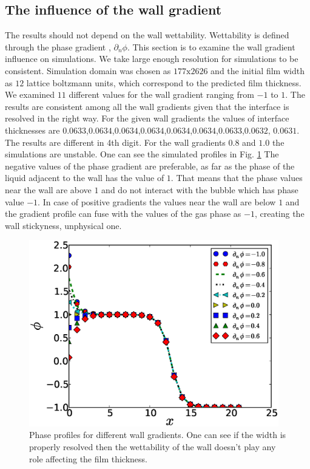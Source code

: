 \documentclass{article}
\begin{document}
\subsection{The influence of the wall gradient}
The results should not depend on the wall wettability. Wettability is defined
through the phase gradient \cite{pooley-contact}, $\partial_n \phi$. This
section is to examine the wall gradient influence on simulations. We take large
enough resolution for simulations to be consistent. Simulation domain was
chosen as $177\mathrm{x}2626$ and the initial film width as
$12$ lattice boltzmann units, which correspond to the predicted film thickness.
We examined $11$ different values for the wall
gradient ranging from $-1$ to $1$. The results are consistent among all the
wall gradients given that the interface is resolved in the right way. For the
given wall gradients the values of interface thicknesses are
$0.0633$,$0.0634$,$0.0634$,$0.0634$,$0.0634$,$0.0634$,$0.0633$,$0.0632$,
$0.0631$. The results are different in 4th digit. For the wall gradients $0.8$
and $1.0$ the
simulations are unstable. One can see the simulated profiles in Fig.
\ref{fig:gradients:profiles} The negative values of the phase gradient are
preferable, as
far as the phase of the liquid adjacent to the wall has the value of $1$. That
means that the phase values near the wall are above $1$ and do not interact
with the bubble which has phase value $-1$.  In case of positive
gradients the values near the wall are below $1$ and the gradient profile can
fuse with the values of the gas phase as $-1$, creating the wall stickyness,
unphysical one.
\begin{figure}
\includegraphics[width=0.97\textwidth]{Figures/Wall/phase_grad_profiles.eps}
\caption{Phase profiles for different wall gradients. One can see if the width
is properly resolved then the wettability of the wall doesn't play any role
affecting the film thickness.
\label{fig:gradients:profiles}
}
\end{figure}
\end{document}

